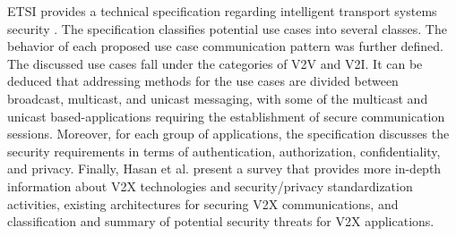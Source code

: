 ETSI provides a technical specification regarding intelligent transport systems security \cite{etsi_2021}. The specification classifies potential use cases into several classes. The behavior of each proposed use case communication pattern was further defined. The discussed use cases fall under the categories of V2V and V2I. It can be deduced that addressing methods for the use cases are divided between broadcast, multicast, and unicast messaging, with some of the multicast and unicast based-applications requiring the establishment of secure communication sessions. Moreover, for each group of applications, the specification discusses the security requirements in terms of authentication, authorization, confidentiality, and privacy. Finally, Hasan et al. \cite{9068410} present a survey that provides more in-depth information about V2X technologies and security/privacy standardization activities, existing architectures for securing V2X communications, and classification and summary of potential security threats for V2X applications.

